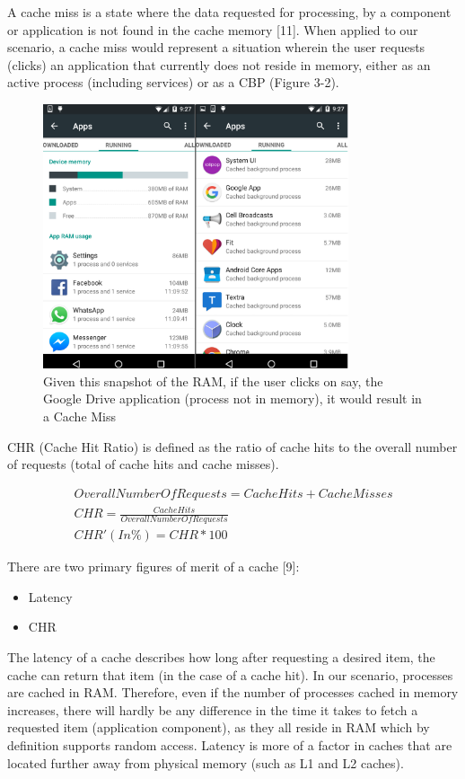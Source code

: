 \documentclass[12pt]{uthesis-v12}  %
\begin{document}
			A cache miss is a state where the data requested for processing, by a component or application is not found in the cache memory [11]. When applied to our scenario, a cache miss would represent a situation wherein the user requests (clicks) an application that currently does not reside in memory, either as an active process (including services) or as a CBP (Figure 3-2).
			
			\begin{figure}[!ht]
				\centering
				\includegraphics[width = 90mm]{images/runningApps.png}
				\caption[Running Applications and CBP(s) - Cache Miss]
				{Given this snapshot of the RAM, if the user clicks on say, the Google Drive application (process not in memory), it would result in a Cache Miss}
			\end{figure}		
			
			CHR (Cache Hit Ratio) is defined as the ratio of cache hits to the overall number of requests (total of cache hits and cache misses).
			
			\begin{eqnarray}
				Overall Number Of Requests = Cache Hits + Cache Misses \label{Total Requests} \\
				CHR = \frac{Cache Hits}{Overall Number Of Requests} \label{CHR} \\
				CHR'(In \%) = CHR * 100 
			\end{eqnarray}
			
			There are two primary figures of merit of a cache [9]:
			
			\begin{itemize}
				\item Latency
				\item CHR
			\end{itemize}
			
			The latency of a cache describes how long after requesting a desired item, the cache can return that item (in the case of a cache hit). In our scenario, processes are cached in RAM. Therefore, even if the number of processes cached in memory increases, there will hardly be any difference in the time it takes to fetch a requested item (application component), as they all reside in RAM which by definition supports random access. Latency is more of a factor in caches that are located further away from physical memory (such as L1 and L2 caches).
			
\end{document}
